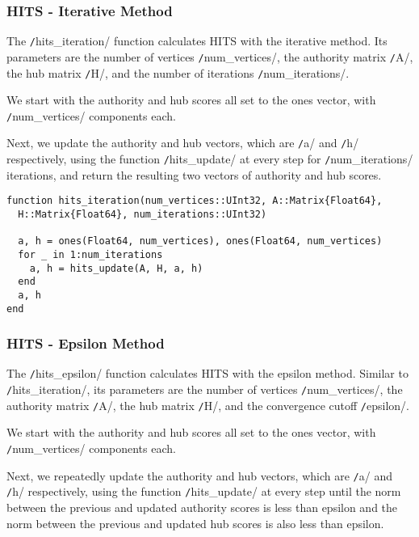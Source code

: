\documentclass[12pt, titlepage, twoside]{amsart}
\begin{document}
\subsubsection{HITS - Iterative Method}

The \texttt/hits_iteration/ function calculates HITS with the iterative method.
Its parameters are the number of vertices \texttt/num_vertices/,
the authority matrix \texttt/A/, the hub matrix \texttt/H/,
and the number of iterations \texttt/num_iterations/.

We start with the authority and hub scores all set to the ones vector, with \texttt/num_vertices/ components each.

Next, we update the authority and hub vectors, which are \texttt/a/ and \texttt/h/ respectively,
using the function \texttt/hits_update/ at every step for \texttt/num_iterations/ iterations, and return the resulting two vectors of authority and hub scores.

\begin{verbatim}
function hits_iteration(num_vertices::UInt32, A::Matrix{Float64},
  H::Matrix{Float64}, num_iterations::UInt32)

  a, h = ones(Float64, num_vertices), ones(Float64, num_vertices)
  for _ in 1:num_iterations
    a, h = hits_update(A, H, a, h)
  end
  a, h
end
\end{verbatim}


\subsubsection{HITS - Epsilon Method}

The \texttt/hits_epsilon/ function calculates HITS with the epsilon method.
Similar to \texttt/hits_iteration/, its parameters are the number of vertices \texttt/num_vertices/,
the authority matrix \texttt/A/, the hub matrix \texttt/H/,
and the convergence cutoff \texttt/epsilon/.

We start with the authority and hub scores all set to the ones vector, with \texttt/num_vertices/ components each.

Next, we repeatedly update the authority and hub vectors,
which are \texttt/a/ and \texttt/h/ respectively,
using the function \texttt/hits_update/ at every step until
the norm between the previous and updated authority scores is less than epsilon and
the norm between the previous and updated hub scores is also less than epsilon.
\end{document}
